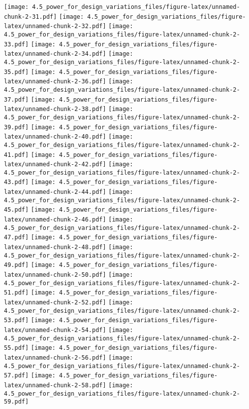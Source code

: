 \documentclass[]{article}
\begin{document}
\texttt{[image: 4.5\_power\_for\_design\_variations\_files/figure-latex/unnamed-chunk-2-31.pdf]}
\texttt{[image: 4.5\_power\_for\_design\_variations\_files/figure-latex/unnamed-chunk-2-32.pdf]}
\texttt{[image: 4.5\_power\_for\_design\_variations\_files/figure-latex/unnamed-chunk-2-33.pdf]}
\texttt{[image: 4.5\_power\_for\_design\_variations\_files/figure-latex/unnamed-chunk-2-34.pdf]}
\texttt{[image: 4.5\_power\_for\_design\_variations\_files/figure-latex/unnamed-chunk-2-35.pdf]}
\texttt{[image: 4.5\_power\_for\_design\_variations\_files/figure-latex/unnamed-chunk-2-36.pdf]}
\texttt{[image: 4.5\_power\_for\_design\_variations\_files/figure-latex/unnamed-chunk-2-37.pdf]}
\texttt{[image: 4.5\_power\_for\_design\_variations\_files/figure-latex/unnamed-chunk-2-38.pdf]}
\texttt{[image: 4.5\_power\_for\_design\_variations\_files/figure-latex/unnamed-chunk-2-39.pdf]}
\texttt{[image: 4.5\_power\_for\_design\_variations\_files/figure-latex/unnamed-chunk-2-40.pdf]}
\texttt{[image: 4.5\_power\_for\_design\_variations\_files/figure-latex/unnamed-chunk-2-41.pdf]}
\texttt{[image: 4.5\_power\_for\_design\_variations\_files/figure-latex/unnamed-chunk-2-42.pdf]}
\texttt{[image: 4.5\_power\_for\_design\_variations\_files/figure-latex/unnamed-chunk-2-43.pdf]}
\texttt{[image: 4.5\_power\_for\_design\_variations\_files/figure-latex/unnamed-chunk-2-44.pdf]}
\texttt{[image: 4.5\_power\_for\_design\_variations\_files/figure-latex/unnamed-chunk-2-45.pdf]}
\texttt{[image: 4.5\_power\_for\_design\_variations\_files/figure-latex/unnamed-chunk-2-46.pdf]}
\texttt{[image: 4.5\_power\_for\_design\_variations\_files/figure-latex/unnamed-chunk-2-47.pdf]}
\texttt{[image: 4.5\_power\_for\_design\_variations\_files/figure-latex/unnamed-chunk-2-48.pdf]}
\texttt{[image: 4.5\_power\_for\_design\_variations\_files/figure-latex/unnamed-chunk-2-49.pdf]}
\texttt{[image: 4.5\_power\_for\_design\_variations\_files/figure-latex/unnamed-chunk-2-50.pdf]}
\texttt{[image: 4.5\_power\_for\_design\_variations\_files/figure-latex/unnamed-chunk-2-51.pdf]}
\texttt{[image: 4.5\_power\_for\_design\_variations\_files/figure-latex/unnamed-chunk-2-52.pdf]}
\texttt{[image: 4.5\_power\_for\_design\_variations\_files/figure-latex/unnamed-chunk-2-53.pdf]}
\texttt{[image: 4.5\_power\_for\_design\_variations\_files/figure-latex/unnamed-chunk-2-54.pdf]}
\texttt{[image: 4.5\_power\_for\_design\_variations\_files/figure-latex/unnamed-chunk-2-55.pdf]}
\texttt{[image: 4.5\_power\_for\_design\_variations\_files/figure-latex/unnamed-chunk-2-56.pdf]}
\texttt{[image: 4.5\_power\_for\_design\_variations\_files/figure-latex/unnamed-chunk-2-57.pdf]}
\texttt{[image: 4.5\_power\_for\_design\_variations\_files/figure-latex/unnamed-chunk-2-58.pdf]}
\texttt{[image: 4.5\_power\_for\_design\_variations\_files/figure-latex/unnamed-chunk-2-59.pdf]}
\end{document}
